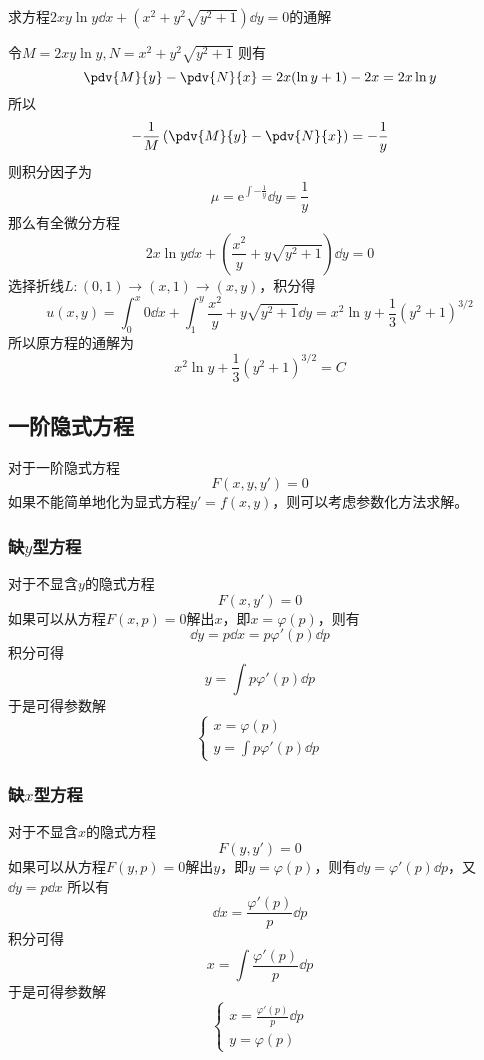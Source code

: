 \begin{example}
    求方程$2xy\ln y\dd{x} + (x^2+y^2\sqrt{y^2+1})\dd{y}=0$的通解
\end{example}
\begin{solution}
    令$M = 2xy\ln y, N = x^2+y^2\sqrt{y^2+1}$
    则有
    \[ \pdv{M}{y} - \pdv{N}{x} = 2x(\ln y + 1) - 2x = 2x\ln y \]
    所以
    \[ -\frac{1}{M}\left(\pdv{M}{y} - \pdv{N}{x}\right) = -\frac{1}{y} \]
    则积分因子为
    \[ \mu = \mathrm{e}^{\int -\frac{1}{y}} \dd{y} = \frac{1}{y} \]
    那么有全微分方程
    \[ 2x\ln y\dd{x} + \left(\frac{x^2}{y} + y\sqrt{y^2+1}\right)\dd{y}=0 \]
    选择折线$L:(0,1)\to(x,1)\to(x,y)$，积分得
    \[ u(x,y) = \int_0^x 0\dd{x} + \int_1^y \frac{x^2}{y} + y\sqrt{y^2+1} \dd{y} = x^2\ln y + \frac{1}{3}(y^2+1)^{3/2} \]
    所以原方程的通解为
    \[ x^2\ln y + \frac{1}{3}(y^2+1)^{3/2} = C \]
\end{solution}

\subsection{一阶隐式方程}
对于一阶隐式方程
\begin{equation*}
    \label{eq:一阶隐式方程}
    F(x,y,y') = 0
\end{equation*}
如果不能简单地化为显式方程$y'=f(x,y)$，则可以考虑参数化方法求解。
\subsubsection{缺\texorpdfstring{$y$}{y}型方程}
对于不显含$y$的隐式方程
\[ F(x,y') = 0 \]
如果可以从方程$F(x,p)=0$解出$x$，即$x=\varphi(p)$，则有
\[ \dd{y} = p\dd{x} = p\varphi'(p)\dd{p} \]
积分可得
\[ y = \int p\varphi'(p)\dd{p} \]
于是可得参数解
\[
    \begin{cases}
        x = \varphi(p) \\
        y = \int p\varphi'(p)\dd{p}
    \end{cases}
\]

\subsubsection{缺\texorpdfstring{$x$}{x}型方程}
对于不显含$x$的隐式方程
\[ F(y,y') = 0 \]
如果可以从方程$F(y,p)=0$解出$y$，即$y=\varphi(p)$，则有$\dd{y} = \varphi'(p)\dd{p}$，又$\dd{y}=p\dd{x}$
所以有
\[ \dd{x} = \frac{\varphi'(p)}{p}\dd{p} \]
积分可得
\[ x = \int \frac{\varphi'(p)}{p}\dd{p} \]
于是可得参数解
\[
    \begin{cases}
        x = \frac{\varphi'(p)}{p}\dd{p} \\
        y = \varphi(p)
    \end{cases}
\]

